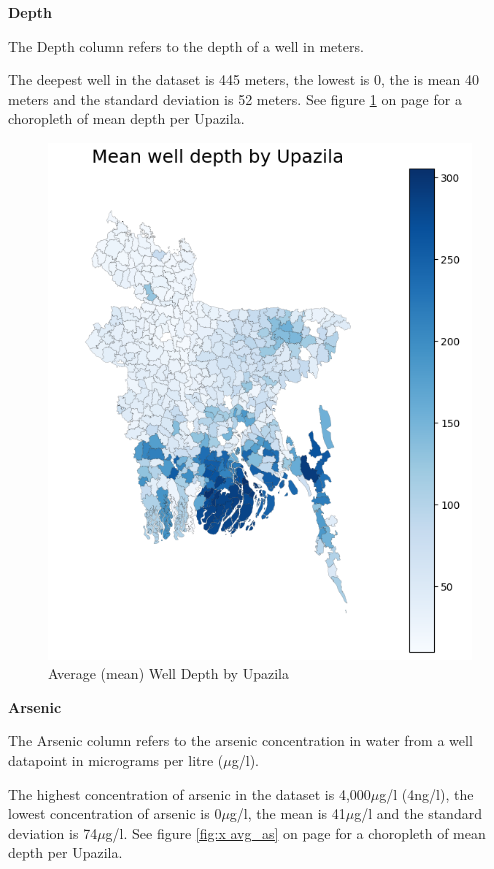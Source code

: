 \textbf{Depth}

The Depth column refers to the depth of a well in meters.

The deepest well in the dataset is 445 meters, the lowest is 0, the is mean 40 meters and the standard deviation is 52 meters. See figure \ref{fig:x avg_depth} on page \pageref{fig:x avg_depth} for a choropleth of mean depth per Upazila.

\begin{figure}[!htb]
    \centering
    \includegraphics[scale=0.6]{figures/mean_well_depth_by_upa.png} 
    \caption{Average (mean) Well Depth by Upazila}
    \label{fig:x avg_depth}
\end{figure}

\textbf{Arsenic}

The Arsenic column refers to the arsenic concentration in water from a well datapoint in micrograms per litre ($\mu$g/l).

The highest concentration of arsenic in the dataset is 4,000$\mu$g/l (4ng/l), the lowest concentration of arsenic is 0$\mu$g/l, the mean is 41$\mu$g/l and the standard deviation is 74$\mu$g/l. See figure \ref{fig:x avg_as} on page \pageref{fig:x avg_as} for a choropleth of mean depth per Upazila.

